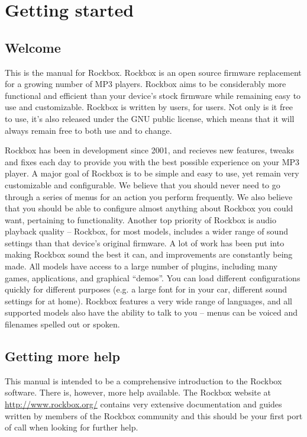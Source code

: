 \chapter{Getting started}
\section{Welcome}
This is the manual for Rockbox. Rockbox is an open source firmware replacement
for a growing number of MP3 players. Rockbox aims to be considerably more
functional and efficient than your device's stock firmware while remaining easy
to use and customizable. Rockbox is written by users, for users. Not only is it
free to use, it's also released under the GNU public license, which means that
it will always remain free to both use and to change.

Rockbox has been in development since 2001, and recieves new features, tweaks
and fixes each day to provide you with the best possible experience on your MP3
player. A major goal of Rockbox is to be simple and easy to use, yet remain very
customizable and configurable. We believe that you should never need to go
through a series of menus for an action you perform frequently. We also believe
that you should be able to configure almost anything about Rockbox you could
want, pertaining to functionality. Another top priority of Rockbox is audio
playback quality -- Rockbox, for most models, includes a wider range of sound
settings than that device's original firmware. A lot of work has been put into
making Rockbox sound the best it can, and improvements are constantly being made.
All models have access to a large number of plugins, including many games,
applications, and graphical ``demos''. You can load different configurations
quickly for different purposes (e.g. a large font for in your car, different
sound settings for at home). Rockbox features a very wide range of languages, and
all supported models also have the ability to talk to you -- menus can be voiced
and filenames spelled out or spoken.

\section{Getting more help}
This manual is intended to be a comprehensive introduction to the Rockbox
software. There is, however, more help available.  The Rockbox website at
\url{http://www.rockbox.org/} contains very extensive documentation and guides
written by members of the Rockbox community and this should be your first port
of call when looking for further help.

